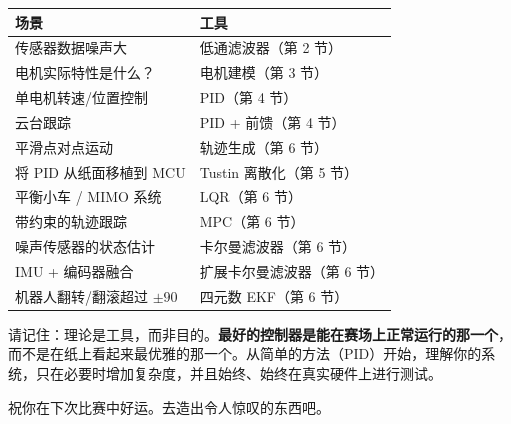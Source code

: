 \begin{center}
\begin{tabular}{ll}
\toprule
\textbf{场景} & \textbf{工具} \\
\midrule
传感器数据噪声大 & 低通滤波器（第 2 节） \\
电机实际特性是什么？ & 电机建模（第 3 节） \\
单电机转速/位置控制 & PID（第 4 节） \\
云台跟踪 & PID + 前馈（第 4 节） \\
平滑点对点运动 & 轨迹生成（第 6 节） \\
将 PID 从纸面移植到 MCU & Tustin 离散化（第 5 节） \\
平衡小车 / MIMO 系统 & LQR（第 6 节） \\
带约束的轨迹跟踪 & MPC（第 6 节） \\
噪声传感器的状态估计 & 卡尔曼滤波器（第 6 节） \\
IMU + 编码器融合 & 扩展卡尔曼滤波器（第 6 节） \\
机器人翻转/翻滚超过 $\pm 90$\textdegree{} & 四元数 EKF（第 6 节） \\
\bottomrule
\end{tabular}
\end{center}

请记住：理论是工具，而非目的。\textbf{最好的控制器是能在赛场上正常运行的那一个}，而不是在纸上看起来最优雅的那一个。从简单的方法（PID）开始，理解你的系统，只在必要时增加复杂度，并且始终、始终在真实硬件上进行测试。

祝你在下次比赛中好运。去造出令人惊叹的东西吧。

